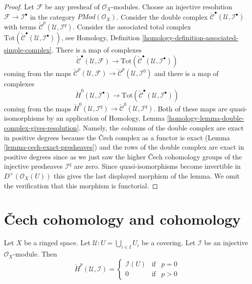 \begin{proof}
\medskip\noindent
Let $\mathcal{F}$ be any presheaf of $\mathcal{O}_X$-modules.
Choose an injective resolution $\mathcal{F} \to \mathcal{I}^\bullet$
in the category $\textit{PMod}(\mathcal{O}_X)$.
Consider the double complex
$\check{\mathcal{C}}^\bullet(\mathcal{U}, \mathcal{I}^\bullet)$ with terms
$\check{\mathcal{C}}^p(\mathcal{U}, \mathcal{I}^q)$.
Consider the associated total complex
$\text{Tot}(\check{\mathcal{C}}^\bullet(\mathcal{U}, \mathcal{I}^\bullet))$,
see Homology, Definition \ref{homology-definition-associated-simple-complex}.
There is a map of complexes
$$
\check{\mathcal{C}}^\bullet(\mathcal{U}, \mathcal{F})
\longrightarrow
\text{Tot}(\check{\mathcal{C}}^\bullet(\mathcal{U}, \mathcal{I}^\bullet))
$$
coming from the maps
$\check{\mathcal{C}}^p(\mathcal{U}, \mathcal{F})
\to \check{\mathcal{C}}^p(\mathcal{U}, \mathcal{I}^0)$
and there is a map of complexes
$$
\check{H}^0(\mathcal{U}, \mathcal{I}^\bullet)
\longrightarrow
\text{Tot}(\check{\mathcal{C}}^\bullet(\mathcal{U}, \mathcal{I}^\bullet))
$$
coming from the maps
$\check{H}^0(\mathcal{U}, \mathcal{I}^q) \to
\check{\mathcal{C}}^0(\mathcal{U}, \mathcal{I}^q)$.
Both of these maps are quasi-isomorphisms by an application of
Homology, Lemma \ref{homology-lemma-double-complex-gives-resolution}.
Namely, the columns of the double complex are exact in positive degrees
because the {\v C}ech complex as a functor is exact
(Lemma \ref{lemma-cech-exact-presheaves})
and the rows of the double complex are exact in positive degrees
since as we just saw the higher {\v C}ech cohomology groups of the injective
presheaves $\mathcal{I}^q$ are zero.
Since quasi-isomorphisms become invertible
in $D^{+}(\mathcal{O}_X(U))$ this gives the last displayed morphism
of the lemma. We omit the verification that this morphism is
functorial.
\end{proof}





\section{{\v C}ech cohomology and cohomology}
\label{section-cech-cohomology-cohomology}

\begin{lemma}
\label{lemma-injective-trivial-cech}
Let $X$ be a ringed space.
Let $\mathcal{U} : U = \bigcup_{i \in I} U_i$ be a covering.
Let $\mathcal{I}$ be an injective $\mathcal{O}_X$-module.
Then
$$
\check{H}^p(\mathcal{U}, \mathcal{I}) =
\left\{
\begin{matrix}
\mathcal{I}(U) & \text{if} & p = 0 \\
0 & \text{if} & p > 0
\end{matrix}
\right.
$$
\end{lemma}

